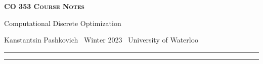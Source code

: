 \documentclass[10pt]{article}
\numberwithin{equation}{section}
\newcommand{\newtitle}[4]{
  \begin{center}
	\huge{\textbf{\textsc{#1 Course Notes}}}
    
	\large{\sc #2}
    
	{\sc #3 \textbullet\, #4 \textbullet\, University of Waterloo}
	\normalsize\vspace{1cm}\hrule
  \end{center}
}
\begin{document}
\pagestyle{fancy}
\newtitle{CO 353}{Computational Discrete Optimization}{Kanstantsin Pashkovich}{Winter 2023}

\tableofcontents
\vspace{1cm}\hrule
\fancyhead[R]{\nouppercase\rightmark}
\newpage 
{}

\newpage
\newpage
\newpage
\newpage
\newpage
\newpage
\end{document}
